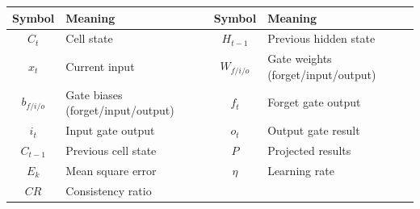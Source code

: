 \setlength{\tabcolsep}{4pt}   %
\renewcommand{\arraystretch}{0.8} %
\begin{tabular}{|c|l|c|l|}
\hline
\textbf{Symbol} & \textbf{Meaning} & \textbf{Symbol} & \textbf{Meaning} \\
\hline
\(C_t\) & Cell state & \(H_{t-1}\) & Previous hidden state \\
\(x_t\) & Current input & \(W_{f/i/o}\) & Gate weights (forget/input/output) \\
\(b_{f/i/o}\) & Gate biases (forget/input/output) & \(f_t\) & Forget gate output \\
\(i_t\) & Input gate output & \(o_t\) & Output gate result \\
\(C_{t-1}\) & Previous cell state & \(P\) & Projected results \\
\(E_k\) & Mean square error & \(\eta\) & Learning rate \\
\(CR\) & Consistency ratio & & \\
\hline
\end{tabular}